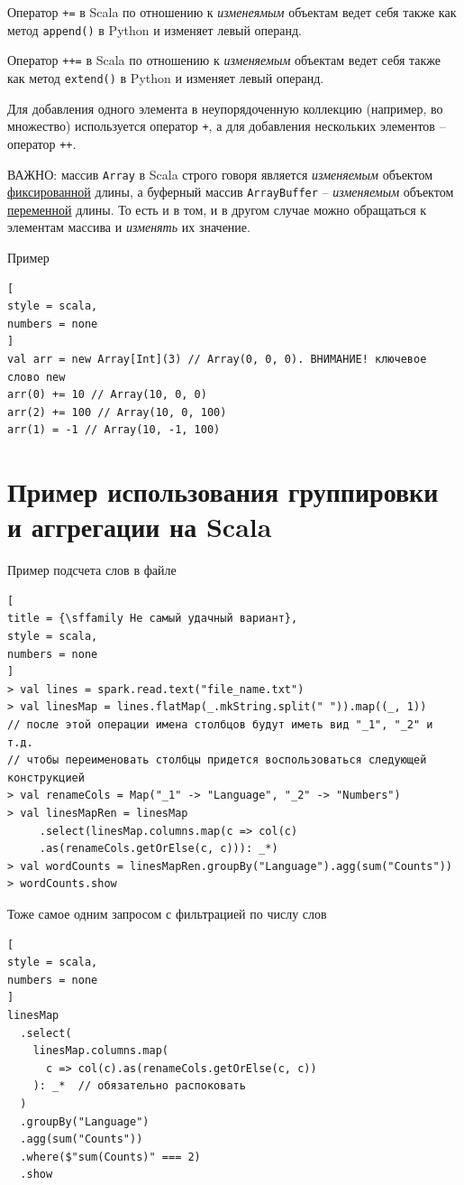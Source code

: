 \documentclass[%
	11pt,
	a4paper,
	utf8,
		]{article}
\begin{document}
Оператор \texttt{+=} в Scala по отношению к \emph{изменеямым} объектам ведет себя также как метод \texttt{append()} в Python и изменяет левый операнд.

Оператор \texttt{++=} в Scala по отношению к \emph{изменяемым} объектам ведет себя также как метод \texttt{extend()} в Python и изменяет левый операнд.

Для добавления одного элемента в неупорядоченную коллекцию (например, во множество) используется оператор \texttt{+}, а для добавления нескольких элементов -- оператор \texttt{++}.

ВАЖНО: массив \texttt{Array} в Scala строго говоря является \emph{изменяемым} объектом \underline{фиксированной} длины, а буферный массив \texttt{ArrayBuffer} -- \emph{изменяемым} объектом \underline{переменной} длины. То есть и в том, и в другом случае можно обращаться к элементам массива и \emph{изменять} их значение.

Пример
\begin{lstlisting}[
style = scala,
numbers = none
]
val arr = new Array[Int](3) // Array(0, 0, 0). ВНИМАНИЕ! ключевое слово new
arr(0) += 10 // Array(10, 0, 0)
arr(2) += 100 // Array(10, 0, 100)
arr(1) = -1 // Array(10, -1, 100)
\end{lstlisting}



\section{Пример использования группировки и аггрегации на Scala}

Пример подсчета слов в файле
\begin{lstlisting}[
title = {\sffamily Не самый удачный вариант},
style = scala,
numbers = none	
]
> val lines = spark.read.text("file_name.txt")
> val linesMap = lines.flatMap(_.mkString.split(" ")).map((_, 1))
// после этой операции имена столбцов будут иметь вид "_1", "_2" и т.д.
// чтобы переименовать столбцы придется воспользоваться следующей конструкцией
> val renameCols = Map("_1" -> "Language", "_2" -> "Numbers")
> val linesMapRen = linesMap
     .select(linesMap.columns.map(c => col(c)
     .as(renameCols.getOrElse(c, c))): _*)
> val wordCounts = linesMapRen.groupBy("Language").agg(sum("Counts"))
> wordCounts.show
\end{lstlisting}

Тоже самое одним запросом с фильтрацией по числу слов
\begin{lstlisting}[
style = scala,
numbers = none	
]
linesMap
  .select(
    linesMap.columns.map(
      c => col(c).as(renameCols.getOrElse(c, c))
    ): _*  // обязательно распоковать
  )
  .groupBy("Language")
  .agg(sum("Counts"))
  .where($"sum(Counts)" === 2)
  .show
\end{lstlisting}
\end{document}
